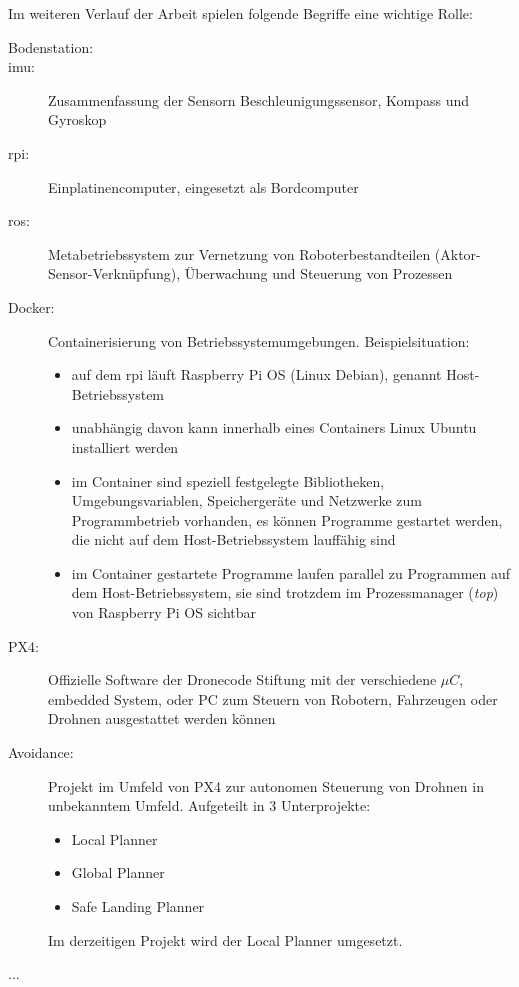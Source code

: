Im weiteren Verlauf der Arbeit spielen folgende Begriffe eine wichtige Rolle:\\
\begin{minipage}[t]{\linewidth}
\begin{description}
    \item[Bodenstation:] 
    \item[\gls{imu}:] Zusammenfassung der Sensorn Beschleunigungssensor, Kompass und Gyroskop
    \item[\gls{rpi}:] Einplatinencomputer, eingesetzt als Bordcomputer
    \item[\gls{ros}:] Metabetriebssystem zur Vernetzung von Roboterbestandteilen (Aktor-Sensor-Verknüpfung), Überwachung und Steuerung von Prozessen
    \item[Docker:] Containerisierung von Betriebssystemumgebungen. Beispielsituation:
    \begin{itemize}
        \item auf dem \gls{rpi} läuft Raspberry Pi OS (Linux Debian), genannt Host-Betriebssystem
        \item unabhängig davon kann innerhalb eines Containers Linux Ubuntu installiert werden
        \item im Container sind speziell festgelegte Bibliotheken, Umgebungsvariablen, Speichergeräte und Netzwerke zum Programmbetrieb vorhanden, es können Programme gestartet werden, die nicht auf dem Host-Betriebssystem lauffähig sind
        \item im Container gestartete Programme laufen parallel zu Programmen auf dem Host-Betriebssystem, sie sind trotzdem im Prozessmanager (\textit{top}) von Raspberry Pi OS sichtbar
    \end{itemize}  
    \item[PX4:] Offizielle Software der Dronecode Stiftung mit der verschiedene $\mu C$, embedded System, oder PC zum Steuern von Robotern, Fahrzeugen oder Drohnen ausgestattet werden können
    \item[Avoidance:] Projekt im Umfeld von PX4 zur autonomen Steuerung von Drohnen in unbekanntem Umfeld. Aufgeteilt in 3 Unterprojekte:
    \begin{itemize}
        \item Local Planner
        \item Global Planner
        \item Safe Landing Planner  
    \end{itemize}
    Im derzeitigen Projekt wird der Local Planner umgesetzt.
    \item[...]
\end{description}
\end{minipage}
